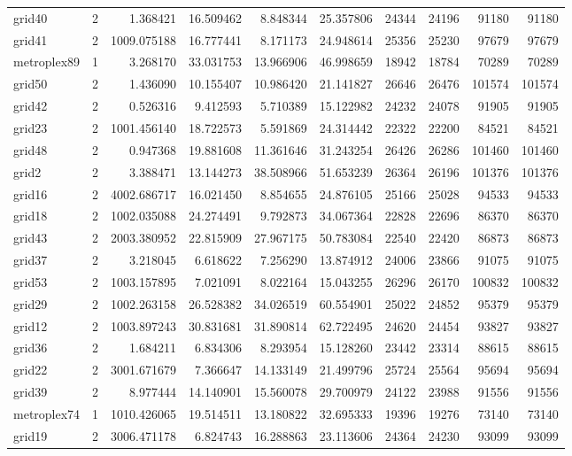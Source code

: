 \begin{longtable}{|l|r|r|r|r|r|r|r|r|r|}
grid40 & 2 & 1.368421 & 16.509462 & 8.848344 & 25.357806 & 24344 & 24196 & 91180 & 91180 \\
grid41 & 2 & 1009.075188 & 16.777441 & 8.171173 & 24.948614 & 25356 & 25230 & 97679 & 97679 \\
metroplex89 & 1 & 3.268170 & 33.031753 & 13.966906 & 46.998659 & 18942 & 18784 & 70289 & 70289 \\
grid50 & 2 & 1.436090 & 10.155407 & 10.986420 & 21.141827 & 26646 & 26476 & 101574 & 101574 \\
grid42 & 2 & 0.526316 & 9.412593 & 5.710389 & 15.122982 & 24232 & 24078 & 91905 & 91905 \\
grid23 & 2 & 1001.456140 & 18.722573 & 5.591869 & 24.314442 & 22322 & 22200 & 84521 & 84521 \\
grid48 & 2 & 0.947368 & 19.881608 & 11.361646 & 31.243254 & 26426 & 26286 & 101460 & 101460 \\
grid2 & 2 & 3.388471 & 13.144273 & 38.508966 & 51.653239 & 26364 & 26196 & 101376 & 101376 \\
grid16 & 2 & 4002.686717 & 16.021450 & 8.854655 & 24.876105 & 25166 & 25028 & 94533 & 94533 \\
grid18 & 2 & 1002.035088 & 24.274491 & 9.792873 & 34.067364 & 22828 & 22696 & 86370 & 86370 \\
grid43 & 2 & 2003.380952 & 22.815909 & 27.967175 & 50.783084 & 22540 & 22420 & 86873 & 86873 \\
grid37 & 2 & 3.218045 & 6.618622 & 7.256290 & 13.874912 & 24006 & 23866 & 91075 & 91075 \\
grid53 & 2 & 1003.157895 & 7.021091 & 8.022164 & 15.043255 & 26296 & 26170 & 100832 & 100832 \\
grid29 & 2 & 1002.263158 & 26.528382 & 34.026519 & 60.554901 & 25022 & 24852 & 95379 & 95379 \\
grid12 & 2 & 1003.897243 & 30.831681 & 31.890814 & 62.722495 & 24620 & 24454 & 93827 & 93827 \\
grid36 & 2 & 1.684211 & 6.834306 & 8.293954 & 15.128260 & 23442 & 23314 & 88615 & 88615 \\
grid22 & 2 & 3001.671679 & 7.366647 & 14.133149 & 21.499796 & 25724 & 25564 & 95694 & 95694 \\
grid39 & 2 & 8.977444 & 14.140901 & 15.560078 & 29.700979 & 24122 & 23988 & 91556 & 91556 \\
metroplex74 & 1 & 1010.426065 & 19.514511 & 13.180822 & 32.695333 & 19396 & 19276 & 73140 & 73140 \\
grid19 & 2 & 3006.471178 & 6.824743 & 16.288863 & 23.113606 & 24364 & 24230 & 93099 & 93099 \\

\end{longtable}
